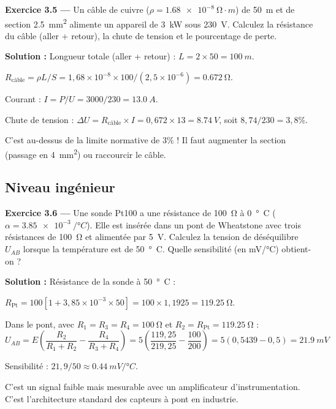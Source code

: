 \documentclass[12pt,a4paper,twoside]{book}
\begin{document}
\textbf{Exercice 3.5 —} Un câble de cuivre ($\rho = \SI{1.68e-8}{\ohm\cdot m}$) de \SI{50}{m} et de section \SI{2.5}{mm^2} alimente un appareil de \SI{3}{kW} sous \SI{230}{V}. Calculez la résistance du câble (aller + retour), la chute de tension et le pourcentage de perte.

\begin{pratique}
\textbf{Solution :} Longueur totale (aller + retour) : $L = 2 \times 50 = \SI{100}{m}$.

$R_{\text{câble}} = \rho L / S = 1{,}68\times10^{-8} \times 100 / (2{,}5\times10^{-6}) = \SI{0.672}{\ohm}$.

Courant : $I = P/U = 3000/230 = \SI{13.0}{A}$.

Chute de tension : $\Delta U = R_{\text{câble}} \times I = 0{,}672 \times 13 = \SI{8.74}{V}$, soit $8{,}74/230 = 3{,}8\%$.

C'est au-dessus de la limite normative de $3\%$ ! Il faut augmenter la section (passage en \SI{4}{mm^2}) ou raccourcir le câble.
\end{pratique}

\subsection*{Niveau ingénieur}

\textbf{Exercice 3.6 —} Une sonde Pt100 a une résistance de \SI{100}{\ohm} à \SI{0}{°C} ($\alpha = \SI{3.85e-3}{/°C}$). Elle est insérée dans un pont de Wheatstone avec trois résistances de \SI{100}{\ohm} et alimentée par \SI{5}{V}. Calculez la tension de déséquilibre $U_{AB}$ lorsque la température est de \SI{50}{°C}. Quelle sensibilité (en mV/°C) obtient-on ?

\begin{pratique}
\textbf{Solution :} Résistance de la sonde à \SI{50}{°C} :

$R_{\text{Pt}} = 100[1 + 3{,}85\times10^{-3} \times 50] = 100 \times 1{,}1925 = \SI{119.25}{\ohm}$.

Dans le pont, avec $R_1 = R_3 = R_4 = \SI{100}{\ohm}$ et $R_2 = R_{\text{Pt}} = \SI{119.25}{\ohm}$ :
\[
U_{AB} = E\left(\frac{R_2}{R_1 + R_2} - \frac{R_4}{R_3 + R_4}\right) = 5\left(\frac{119{,}25}{219{,}25} - \frac{100}{200}\right) = 5(0{,}5439 - 0{,}5) = \SI{21.9}{mV}
\]

Sensibilité : $21{,}9 / 50 \approx \SI{0.44}{mV/°C}$.

C'est un signal faible mais mesurable avec un amplificateur d'instrumentation. C'est l'architecture standard des capteurs à pont en industrie.
\end{pratique}
\end{document}
